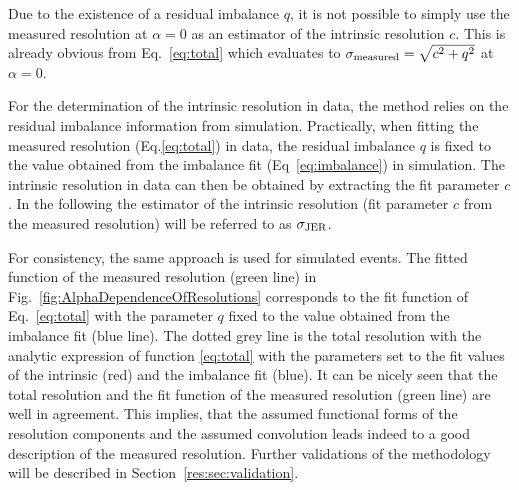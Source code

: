 Due to the existence of a residual imbalance $q$, it is not possible to simply use the measured resolution at $\alpha=0$ as an estimator of the intrinsic resolution $c$.
This is already obvious from Eq.~\eqref{eq:total} which evaluates to $\sigma_\mathrm{measured}  = \sqrt{c^2 + q^2}$ at $\alpha=0$.

For the determination of the intrinsic resolution in data, the method relies on the residual imbalance information from simulation.
Practically, when fitting the measured resolution (Eq.\eqref{eq:total}) in data, the residual imbalance $q$ is fixed to the value obtained from the imbalance fit (Eq~\ref{eq:imbalance}) in simulation.
The intrinsic resolution in data can then be obtained by extracting the fit parameter $c$.
In the following the estimator of the intrinsic resolution (fit parameter $c$ from the measured resolution) will be referred to as $\sigma_\mathrm{JER}$.

For consistency, the same approach is used for simulated events.
The fitted function of the measured resolution (green line) in Fig.~\ref{fig:AlphaDependenceOfResolutions} corresponds to the fit function of Eq.~\eqref{eq:total} with the parameter $q$ fixed to the value obtained from the imbalance fit (blue line).
The dotted grey line is the total resolution with the analytic expression of function \eqref{eq:total} with the parameters set to the fit values of the intrinsic (red) and the imbalance fit (blue). 
It can be nicely seen that the total resolution and the fit function of the measured resolution (green line) are well in agreement.
This implies, that the assumed functional forms of the resolution components and the assumed convolution leads indeed to a good description of the measured resolution.
Further validations of the methodology will be described in Section~\ref{res:sec:validation}.

